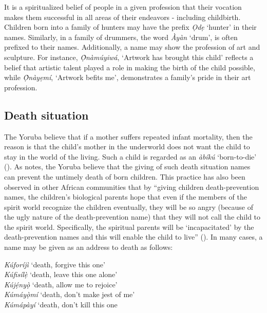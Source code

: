 \documentclass[output=paper,colorlinks,citecolor=brown]{langscibook}
\begin{document}
It is a spiritualized belief of people in a given profession that their vocation makes them successful in all areas of their endeavors - including childbirth.  Children born into a family of hunters may have the prefix \textit{Ọdẹ} `hunter' in their names. Similarly, in a family of drummers, the word \textit{Àyàn} `drum', is often prefixed to their names. Additionally, a name may show the profession of art and sculpture. For instance, \textit{Ọ̀nàmúyiwá}, ‘Artwork has brought this child’ reflects a belief that artistic talent played a role in making the birth of the child possible, while \textit{Ọ̀nàyẹmí}, ‘Artwork befits me’, demonstrates a family’s pride in their art profession.

\subsection{Death situation}

The Yoruba believe that if a mother suffers repeated infant mortality, then the reason is that the child’s mother in the underworld does not want the child to stay in the world of the living. Such a child is regarded as an \textit{àbíkú} ‘born-to-die’ (\cite{Ehineni2019}). As \citet{Akinyemi2005} notes, the Yoruba believe that the giving of such death situation names can prevent the untimely death of born children. This practice has also been observed in other African communities that by ``giving children death-prevention names, the children’s biological parents hope that even if the members of the spirit world recognize the children eventually, they will  be so angry (because of the ugly nature of the death-prevention name) that they will not call the child to the spirit world. Specifically, the spiritual parents will be `incapacitated' by the death-prevention names and this will enable the child to live'' (\cite[166]{Obeng1998}). In many cases, a name may be given as an address to death as follows:

\ea \label{DeathNames1}
\begin{xlist}
\ex	\textit{Kúforíjì}			‘death, forgive this one’\\
\ex	\textit{Kúfisílẹ̀}			‘death, leave this one alone’\\
\ex	\textit{Kújẹ́nyọ̀}		‘death, allow me to rejoice’\\
\ex	\textit{Kúmáyọ̀mí}		‘death, don’t make jest of me’  \\
\ex	\textit{Kúmápàyí}		 ‘death, don’t kill this one\\
\end{xlist}
\z
\end{document}
